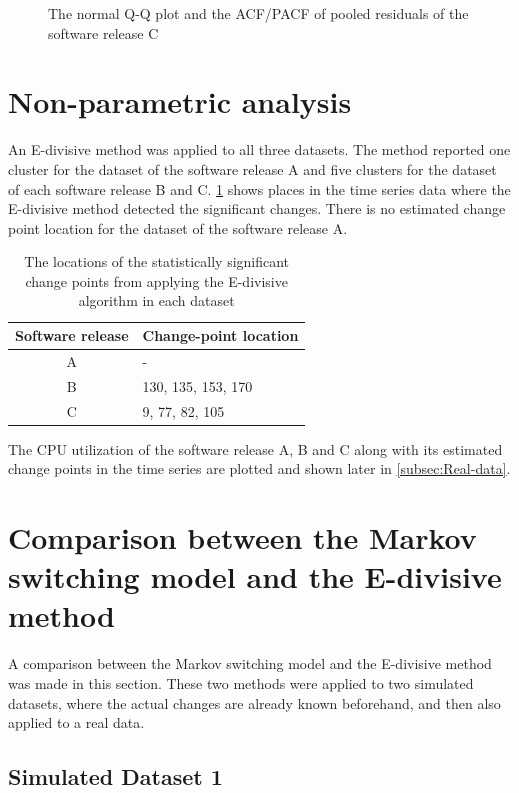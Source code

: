 \begin{figure}[H]
\begin{centering}
\par\end{centering}
\caption{The normal Q-Q plot and the ACF/PACF of pooled residuals of the software
release C}
\label{L17A_plotDiag}
\end{figure}


\section{Non-parametric analysis}

An E-divisive method was applied to all three datasets. The method
reported one cluster for the dataset of the software release A and
five clusters for the dataset of each software release B and C. \ref{ediv}
shows places in the time series data where the E-divisive method detected
the significant changes. There is no estimated change point location
for the dataset of the software release A.

\begin{table}[h]
\caption{The locations of the statistically significant change points from
applying the E-divisive algorithm in each dataset}
\label{ediv}
\centering{}%
\begin{tabular}{cl}
\toprule 
Software release & Change-point location\tabularnewline
\midrule
\midrule 
A & -\tabularnewline
B & 130, 135, 153, 170\tabularnewline
C & 9, 77, 82, 105\tabularnewline
\bottomrule
\end{tabular}
\end{table}

The CPU utilization of the software release A, B and C along with
its estimated change points in the time series are plotted and shown
later in \ref{subsec:Real-data}. 

\section{Comparison between the Markov switching model and the E-divisive
method}

A comparison between the Markov switching model and the E-divisive
method was made in this section. These two methods were applied to
two simulated datasets, where the actual changes are already known
beforehand, and then also applied to a real data.

\subsection{Simulated Dataset 1}

